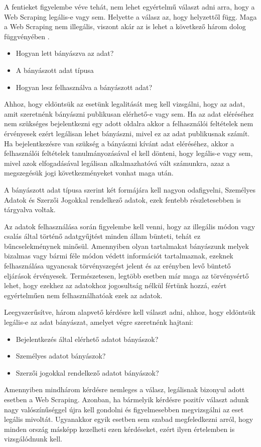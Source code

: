 A fentieket figyelembe véve tehát, nem lehet egyértelmű választ adni arra, hogy a Web Scraping legális-e vagy sem. Helyette a válasz az, hogy helyzettől függ. Maga a Web Scraping nem illegális, viszont akár az is lehet a következő három dolog függvényében \cite{isWSLegal}. 

\begin{itemize}
    \item Hogyan lett bányászva az adat?
    \item A bányászott adat típusa
    \item Hogyan lesz felhasználva a bányászott adat?
\end{itemize}

Ahhoz, hogy eldöntsük az esetünk legalitását meg kell vizsgálni, hogy az adat, amit szeretnénk bányászni publikusan elérhető-e vagy sem. Ha az adat eléréséhez nem szükséges bejelentkezni egy adott oldalra akkor a felhasználói feltételek nem érvényesek ezért legálisan lehet bányászni, mivel ez az adat publikusnak számít. Ha bejelentkezésre van szükség a bányászni kívánt adat eléréséhez, akkor a felhasználói feltételek tanulmányozásával el kell dönteni, hogy legális-e vagy sem, mivel azok elfogadásával legálisan alkalmazhatóvá vált számunkra, azaz a megszegésük jogi következményeket vonhat maga után.

A bányászott adat típusa szerint két formájára kell nagyon odafigyelni, Személyes Adatok és Szerzői Jogokkal rendelkező adatok, ezek fentebb részletesebben is tárgyalva voltak.

Az adatok felhasználása során figyelembe kell venni, hogy az illegális módon vagy csalás által történő adatgyűjtést minden állam bünteti, tehát ez bűncselekménynek minősül. Amennyiben olyan tartalmakat bányászunk melyek bizalmas vagy bármi féle módon védett információt tartalmaznak, ezeknek felhasználása ugyancsak törvényszegést jelent és az erényben levő büntető eljárások érvényesek. Természetesen, legtöbb esetben már maga az törvénysértő lehet, hogy ezekhez az adatokhoz jogosultság nélkül fértünk hozzá, ezért egyértelműen nem felhasználhatóak ezek az adatok. 

Leegyszerűsítve, három alapvető kérdésre kell választ adni, ahhoz, hogy eldöntsük legális-e az adat bányászat, amelyet végre szeretnénk hajtani: 

\begin{itemize}
    \item Bejelentkezés által elérhető adatot bányászok?
    \item Személyes adatot bányászok?
    \item Szerzői jogokkal rendelkező adatot bányászok?
\end{itemize}

Amennyiben mindhárom kérdésre nemleges a válasz, legálisnak bizonyul adott esetben a Web Scraping. Azonban, ha bármelyik kérdésre pozitív választ adunk nagy valószínűséggel újra kell gondolni és figyelmesebben megvizsgálni az eset legális mivoltát. Ugyanakkor egyik esetben sem szabad megfeledkezni arról, hogy minden ország másképp kezelheti ezen kérdéseket, ezért ilyen értelemben is vizsgálódnunk kell.